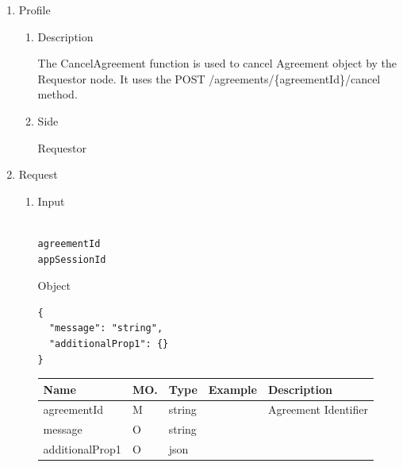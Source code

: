 \begin{enumerate}

\item Profile

\begin{enumerate}

\item Description

The CancelAgreement function is used to cancel Agreement object by the Requestor node. 
It uses the POST /agreements/\{agreementId\}/cancel method.

\item Side

Requestor

\end{enumerate}

\item Request

\begin{enumerate}

\item Input

\begin{tcolorbox}[boxrule=0pt, frame empty]
\begin{verbatim}

agreementId
appSessionId

\end{verbatim}
\end{tcolorbox}

Object
\begin{tcolorbox}[boxrule=0pt, frame empty]
\begin{verbatim}
{
  "message": "string",
  "additionalProp1": {}
}
\end{verbatim}
\end{tcolorbox}

\begin{center}
\begin{tabular}{|p{3cm}|l|p{3cm}|p{3cm}|p{4cm}|} 
\hline
\rowcolor{lightgray}	Name	& MO.	& Type	& Example & 	Description \\
\hline

agreementId		& M & 	string				&		& 	Agreement Identifier \\
\hline

message 		& O	& 	string				&		&	 	\\ 
\hline

additionalProp1 & O	& 	json				&		&	 	\\ 
\hline

\end{tabular}
\end{center}


\end{enumerate}
\end{enumerate}

